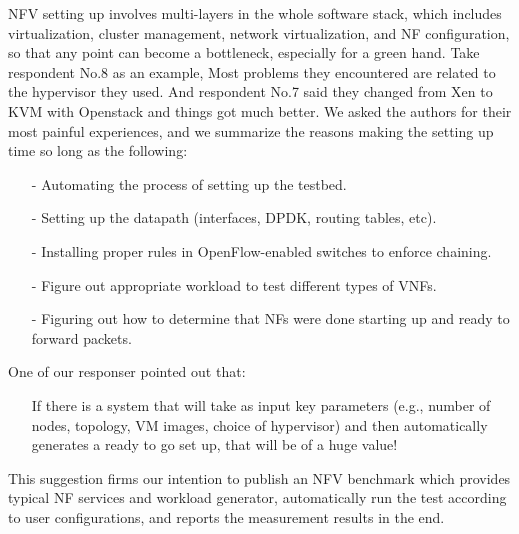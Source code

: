 \documentclass{sig-alternate-10pt}
\begin{document}
NFV setting up involves multi-layers in the whole software stack,
which includes virtualization, cluster management,
network virtualization, and NF configuration,
so that any point can become a bottleneck,
especially for a green hand.
Take respondent No.8 as an example,
Most problems they encountered are related to the hypervisor they used.
And respondent No.7 said they changed from Xen
to KVM with Openstack and things got much better.
We asked the authors for their most painful experiences,
and we summarize the reasons making the setting up time so long
as the following:

\begin{itemize}
\item[-]{}
Automating the process of setting up the testbed.
\item[-]{}
Setting up the datapath (interfaces, DPDK, routing tables, etc).
\item[-]{}
Installing proper rules in OpenFlow-enabled switches to enforce chaining.
\item[-]{}
Figure out appropriate workload to test different types of VNFs.
\item[-]{}
Figuring out how to determine that NFs were done starting up and ready to forward packets.
\end{itemize}

%
%
%
%

One of our responser pointed out that:
\begin{itemize}
\item[]{}
If there is a system that will take as input key parameters (e.g., number of nodes, topology, VM images, choice of hypervisor) and then automatically generates a ready to go set up, that will be of a huge value!
\end{itemize}
This suggestion firms our intention to publish an NFV benchmark
which provides typical NF services and workload generator,
automatically run the test according to user configurations,
and  reports the measurement results in the end.
\end{document}
